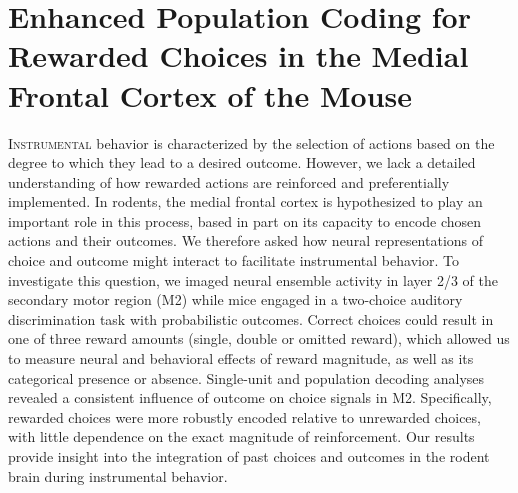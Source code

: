 \chapter{Enhanced Population Coding for Rewarded Choices in the Medial Frontal Cortex of the Mouse}
\label{CC_paper}


\lettrine[lines=3]{I}{nstrumental} behavior is characterized by the selection of actions based on the degree to which they lead to a desired outcome. However, we lack a detailed understanding of how rewarded actions are reinforced and preferentially implemented. In rodents, the medial frontal cortex is hypothesized to play an important role in this process, based in part on its capacity to encode chosen actions and their outcomes. We therefore asked how neural representations of choice and outcome might interact to facilitate instrumental behavior. To investigate this question, we imaged neural ensemble activity in layer 2/3 of the secondary motor region (M2) while mice engaged in a two-choice auditory discrimination task with probabilistic outcomes. Correct choices could result in one of three reward amounts (single, double or omitted reward), which allowed us to measure neural and behavioral effects of reward magnitude, as well as its categorical presence or absence. Single-unit and population decoding analyses revealed a consistent influence of outcome on choice signals in M2. Specifically, rewarded choices were more robustly encoded relative to unrewarded choices, with little dependence on the exact magnitude of reinforcement. Our results provide insight into the integration of past choices and outcomes in the rodent brain during instrumental behavior. 
\clearpage









